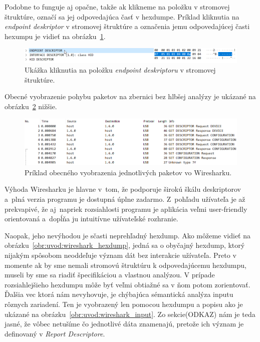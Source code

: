 Podobne to funguje aj opačne, takže ak klikneme na položku v stromovej štruktúre, označí sa jej odpovedajúca časť v hexdumpe. Príklad kliknutia na \textit{endpoint deskriptor} v stromovej štruktúre a označenia jemu odpovedajúcej časti hexumpu je vidieť na obrázku~\ref{obr:uvod:tree_click}.

\begin{figure}[!htb]
	\centering
	\includegraphics[width=\textwidth]{img/uvod_wireshark_tree_click}
	\caption{Ukážka kliknutia na položku \textit{endpoint deskriptoru} v stromovej štruktúre.}
	\label{obr:uvod:tree_click}
\end{figure}

Obecné vyobrazenie pohybu paketov na zbernici bez hlbšej analýzy je ukázané na obrázku~\ref{obr:uvod:wireshark_listview} nižšie.

\begin{figure}[!htb]
	\centering
	\includegraphics[width=\textwidth]{img/uvod_wireshark_listview}
	\caption{Príklad obecného vyobrazenia jednotlivých paketov vo Wiresharku.}
	\label{obr:uvod:wireshark_listview}
\end{figure}

Výhoda Wiresharku je hlavne v~tom, že podporuje širokú škálu deskriptorov a~plná verzia programu je dostupná úplne zadarmo. Z~pohľadu užívateľa je až prekvapivé, že aj~napriek rozsiahlosti programu je aplikácia veľmi user-friendly orientovaná a~dopĺňa ju intuitívne užívateľské rozhranie.

Naopak, jeho nevýhodou je sčasti neprehľadný hexdump. Ako môžeme vidieť na obrázku~\ref{obr:uvod:wireshark_hexdump}, jedná sa o obyčajný hexdump, ktorý nijakým spôsobom neoddeľuje význam dát bez interakcie užívateľa. Preto v momente ak by sme nemali stromovú štruktúru k odpovedajúcemu hexdumpu, museli by sme sa riadiť špecifikáciou a vlastnou analýzou. V prípade rozsiahlejšieho hexdumpu môže byť veľmi obtiažné sa v ňom potom zorientovať. Ďalšia vec ktorá nám nevyhovuje, je chýbajúca sémantická analýza inputu rôznych zariadení. Ten je vyobrazený len pomocou hexdumpu a popisu  ako je ukázané na obrázku~\ref{obr:uvod:wireshark_input}. Zo sekcie(ODKAZ) nám je teda jasné, že vôbec netušíme čo jednotlivé dáta znamenajú, pretože ich význam je definovaný v \textit{Report Descriptore}.

